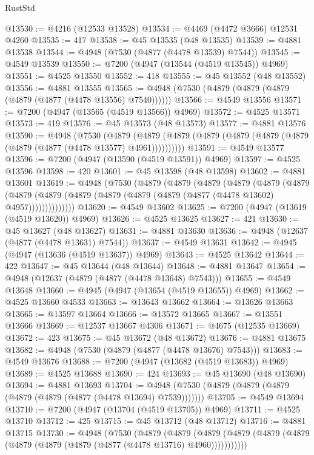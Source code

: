 \begin{lexlean}{RustStd}
\begin{coremodule}
@13530 := @4216 (@12533 @13528)
@13534 := @4469 (@4472 @3666) @12531 @4260
@13535 := 417
@13538 := @45 @13535 (@48 @13535)
@13539 := @4881 @13538
@13544 := @4948 (@7530 (@4877 (@4478 @13539) @7544))
@13545 := @4549 @13539
@13550 := @7200 (@4947 (@13544 (@4519 @13545)) @4969)
@13551 := @4525 @13550
@13552 := 418
@13555 := @45 @13552 (@48 @13552)
@13556 := @4881 @13555
@13565 := @4948 (@7530 (@4879 (@4879 (@4879 (@4879 (@4877 (@4478 @13556) @7540))))))
@13566 := @4549 @13556
@13571 := @7200 (@4947 (@13565 (@4519 @13566)) @4969)
@13572 := @4525 @13571
@13573 := 419
@13576 := @45 @13573 (@48 @13573)
@13577 := @4881 @13576
@13590 := @4948
    (@7530
      (@4879 (@4879 (@4879 (@4879 (@4879 (@4879 (@4879 (@4879 (@4877 (@4478 @13577) @4961))))))))))
@13591 := @4549 @13577
@13596 := @7200 (@4947 (@13590 (@4519 @13591)) @4969)
@13597 := @4525 @13596
@13598 := 420
@13601 := @45 @13598 (@48 @13598)
@13602 := @4881 @13601
@13619 := @4948
    (@7530
      (@4879
        (@4879
          (@4879
            (@4879
              (@4879
                (@4879
                  (@4879
                    (@4879 (@4879 (@4879 (@4879 (@4879 (@4877 (@4478 @13602) @4957))))))))))))))
@13620 := @4549 @13602
@13625 := @7200 (@4947 (@13619 (@4519 @13620)) @4969)
@13626 := @4525 @13625
@13627 := 421
@13630 := @45 @13627 (@48 @13627)
@13631 := @4881 @13630
@13636 := @4948 (@12637 (@4877 (@4478 @13631) @7544))
@13637 := @4549 @13631
@13642 := @4945 (@4947 (@13636 (@4519 @13637)) @4969)
@13643 := @4525 @13642
@13644 := 422
@13647 := @45 @13644 (@48 @13644)
@13648 := @4881 @13647
@13654 := @4948 (@12637 (@4879 (@4877 (@4478 @13648) @7543)))
@13655 := @4549 @13648
@13660 := @4945 (@4947 (@13654 (@4519 @13655)) @4969)
@13662 := @4525 @13660 @4533
@13663 := @13643 @13662
@13664 := @13626 @13663
@13665 := @13597 @13664
@13666 := @13572 @13665
@13667 := @13551 @13666
@13669 := @12537 @13667 @4306
@13671 := @4675 (@12535 @13669)
@13672 := 423
@13675 := @45 @13672 (@48 @13672)
@13676 := @4881 @13675
@13682 := @4948 (@7530 (@4879 (@4877 (@4478 @13676) @7543)))
@13683 := @4549 @13676
@13688 := @7200 (@4947 (@13682 (@4519 @13683)) @4969)
@13689 := @4525 @13688
@13690 := 424
@13693 := @45 @13690 (@48 @13690)
@13694 := @4881 @13693
@13704 := @4948 (@7530 (@4879 (@4879 (@4879 (@4879 (@4879 (@4877 (@4478 @13694) @7539)))))))
@13705 := @4549 @13694
@13710 := @7200 (@4947 (@13704 (@4519 @13705)) @4969)
@13711 := @4525 @13710
@13712 := 425
@13715 := @45 @13712 (@48 @13712)
@13716 := @4881 @13715
@13730 := @4948
    (@7530
      (@4879
        (@4879
          (@4879 (@4879 (@4879 (@4879 (@4879 (@4879 (@4879 (@4877 (@4478 @13716) @4960)))))))))))

\end{coremodule}
\end{lexlean}
